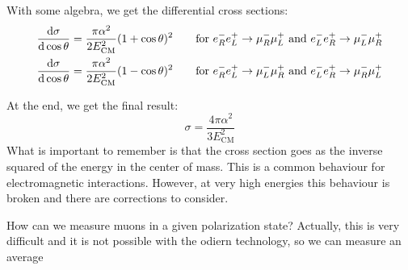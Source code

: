 \documentclass[../../main/main.tex]{subfiles}
\begin{document}
With some algebra, we get the differential cross sections:
\begin{subequations}
	\begin{align}
		\dv{\sigma}{\cos \theta}	&=	\frac{\pi \alpha^2}{2E^2_\mathrm{CM}} (1 + \cos \theta)^2
		\qquad \text{for} \ e^-_R e^+_L \rightarrow \mu^-_R \mu^+_L \ \text{and} \ e^-_L e^+_R \rightarrow \mu^-_L \mu^+_R
		\\
		\dv{\sigma}{\cos \theta}	&=	\frac{\pi \alpha^2}{2E^2_\mathrm{CM}} (1 - \cos \theta)^2
		\qquad \text{for} \ e^-_R e^+_L \rightarrow \mu^-_L \mu^+_R \ \text{and} \ e^-_L e^+_R \rightarrow \mu^-_R \mu^+_L
	\end{align}
	\label{eq:}
\end{subequations}

At the end, we get the final result:
\begin{equation}
	\sigma
	=
	\frac{4\pi \alpha^2}{3E^2_\mathrm{CM}}
	\label{eq:}
\end{equation}
What is important to remember is that the cross section goes as the inverse squared of the energy in the center of mass. This is a common behaviour for electromagnetic interactions. However, at very high energies this behaviour is broken and there are corrections to consider.

How can we measure muons in a given polarization state? Actually, this is very difficult and it is not possible with the odiern technology, so we can measure an average
\end{document}
